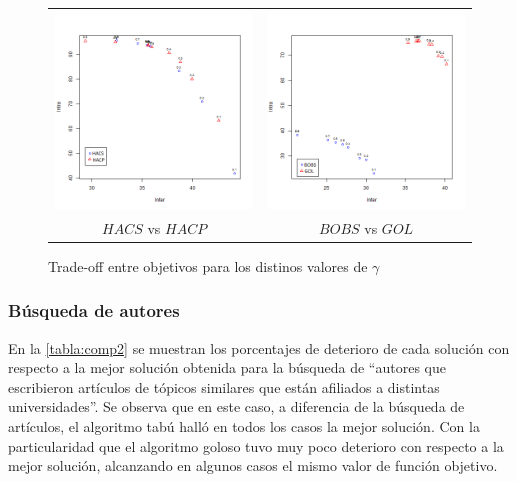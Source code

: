 \begin{figure}[H]
	\centering
	\begin{tabular}{cc}
			\includegraphics[width=0.45\linewidth]{img/alg1_vs_alg5.png}&
			\includegraphics[width=0.45\linewidth]{img/alg2_vs_alg7.png}\\
			$HACS$ vs $HACP$ & $BOBS$ vs $GOL$\\
	\end{tabular}
	\caption{Trade-off entre objetivos para los distinos valores de $\gamma$}
	\label{res:inter_intra}
\end{figure}

\subsubsection{Búsqueda de autores}
En la \autoref{tabla:comp2} se muestran los porcentajes de deterioro de cada solución con respecto a la mejor solución obtenida para la búsqueda de ``autores que escribieron artículos de tópicos similares que están afiliados a distintas universidades''. Se observa que en este caso, a diferencia de la búsqueda de artículos, el algoritmo tabú halló en todos los casos la mejor solución. Con la particularidad que el algoritmo goloso tuvo muy poco deterioro con respecto a la mejor solución, alcanzando en algunos casos el mismo valor de función objetivo.

